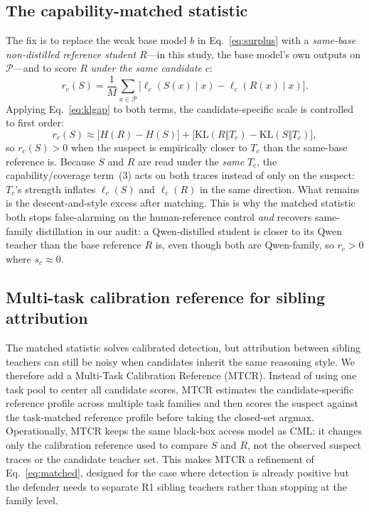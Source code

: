 \documentclass[journal]{IEEEtran}
\begin{document}
\subsection{The capability-matched statistic}
\label{sec:method:matched}
The fix is to replace the weak base model $b$ in Eq.~\eqref{eq:surplus} with a
\emph{same-base non-distilled reference student} $R$---in this study, the base
model's own outputs on $\mathcal{P}$---and to score $R$ \emph{under the same
candidate} $c$:
\begin{equation}
r_c(S)=\frac{1}{M}\sum_{x\in\mathcal{P}}\big[\ell_c(S(x)\mid x)-\ell_c(R(x)\mid x)\big].
\label{eq:matched}
\end{equation}
Applying Eq.~\eqref{eq:klgap} to both terms, the candidate-specific scale is controlled
to first order:
\begin{equation}
r_c(S)\approx \big[H(R)-H(S)\big]+\big[\mathrm{KL}(R\Vert T_c)-\mathrm{KL}(S\Vert T_c)\big],
\label{eq:matcheddecomp}
\end{equation}
so $r_c(S)>0$ when the suspect is empirically closer to $T_c$ than the same-base
reference is. Because $S$ and $R$ are read under the \emph{same} $T_c$, the
capability/coverage term~(3) acts on both traces instead of only on the suspect:
$T_c$'s strength inflates $\ell_c(S)$ and $\ell_c(R)$ in the same direction. What
remains is the descent-and-style excess after matching. This is why the matched
statistic both stops false-alarming on the human-reference control \emph{and} recovers
same-family distillation in our audit: a Qwen-distilled student is closer to its Qwen
teacher than the base reference $R$ is, even though both are Qwen-family, so $r_c>0$
where $s_c\!\approx\!0$.

\subsection{Multi-task calibration reference for sibling attribution}
\label{sec:method:mtcr}
The matched statistic solves calibrated detection, but attribution between sibling
teachers can still be noisy when candidates inherit the same reasoning style. We
therefore add a Multi-Task Calibration Reference (MTCR). Instead of using one task
pool to center all candidate scores, MTCR estimates the candidate-specific reference
profile across multiple task families and then scores the suspect against the
task-matched reference profile before taking the closed-set argmax. Operationally,
MTCR keeps the same black-box access model as CML: it changes only the calibration
reference used to compare $S$ and $R$, not the observed suspect traces or the candidate
teacher set. This makes MTCR a refinement of Eq.~\eqref{eq:matched}, designed for the
case where detection is already positive but the defender needs to separate R1 sibling
teachers rather than stopping at the family level.
\end{document}
